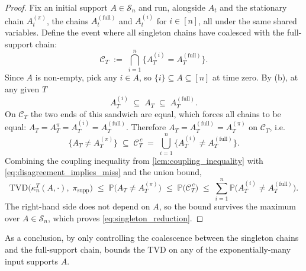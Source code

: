 \documentclass[
    aps,
    superscriptaddress,
    onecolumn,
    10pt,
    prx,
    nofootinbib
]{revtex4-2}
\theoremstyle{namedstatement}
\theoremstyle{plain}
\begin{document}
\begin{proof}
Fix an initial support $A \in \mathcal{S}_n$ and run, alongside $A_t$ and the
stationary chain $A^{(\pi)}_t$, the chains $A^{(\mathrm{full})}_t$ and
$A^{(i)}_t$ for $i \in [n]$, all under the same shared variables. Define the event where all singleton chains have coalesced with the full-support chain:
\begin{equation}\label{eq:catchup_event}
    \mathcal{C}_T \;:=\; \bigcap_{i=1}^{n}
    \big\{ A^{(i)}_T = A^{(\mathrm{full})}_T \big\}.
\end{equation}
Since $A$ is non-empty, pick any $i \in A$, so $\{i\} \subseteq A \subseteq [n]$ at time zero. By
(b), at any given $T$
\begin{equation}
    A^{(i)}_T \;\subseteq\; A_T \;\subseteq\; A^{(\mathrm{full})}_T .
\end{equation}
On $\mathcal{C}_T$ the two ends of this sandwich are equal, which forces all chains to be equal:
$A_T=A_T^{\pi}=A_T^{(i)} = A^{(\mathrm{full})}_T$. Therefore
$A_T = A^{(\mathrm{full})}_T = A^{(\pi)}_T$ on $\mathcal{C}_T$, i.e.
\begin{equation}\label{eq:disagreement_implies_miss}
    \big\{ A_T \neq A^{(\pi)}_T \big\} \;\subseteq\; \mathcal{C}_T^{\,c}
    \;=\; \bigcup_{i=1}^{n} \big\{ A^{(i)}_T \neq A^{(\mathrm{full})}_T \big\}.
\end{equation}
Combining the coupling inequality from \cref{lem:coupling_inequality} with
\cref{eq:disagreement_implies_miss} and the union bound,
\begin{equation}
    \mathrm{TVD}\big( \kappa_n^{T}(A,\cdot),\; \pi_{\mathrm{supp}} \big)
    \;\le\;
    \mathbb{P}\big( A_T \neq A^{(\pi)}_T \big)
    \;\le\;
    \mathbb{P}\big( \mathcal{C}_T^{\,c} \big)
    \;\le\;
    \sum_{i=1}^{n} \mathbb{P}\big( A^{(i)}_T \neq A^{(\mathrm{full})}_T \big).
\end{equation}
The right-hand side does not depend on $A$, so the bound survives the maximum over $A \in \mathcal{S}_n$, which proves \cref{eq:singleton_reduction}.
\end{proof}

As a conclusion, by only controlling the coalescence between the singleton chains and the full-support chain,  bounds the TVD on any of the exponentially-many input supports $A$.
\end{document}
